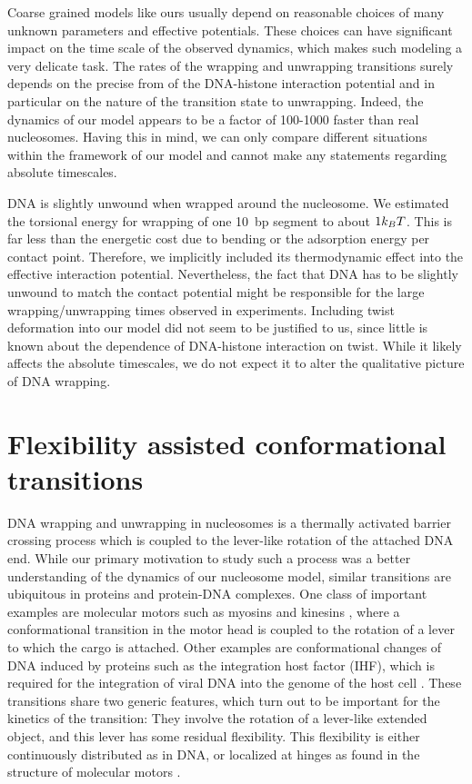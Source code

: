 Coarse grained models like ours usually depend on reasonable choices of 
many unknown parameters and effective potentials. These choices can have significant impact
on the time scale of the observed dynamics, which makes such modeling a very delicate task. 
The rates of the wrapping and unwrapping transitions surely depends on the precise from 
of the DNA-histone interaction potential and in particular on the nature of the transition
state to unwrapping. Indeed, the dynamics of our model appears to be a factor of 100-1000 
faster than real nucleosomes. Having this in mind, 
we can only compare different situations within the framework of our model and cannot make any 
statements regarding absolute timescales. 

DNA is slightly unwound when wrapped around the nucleosome. 
We estimated the torsional energy for wrapping of one 10~bp segment to about $1k_BT$. This is far
less than the energetic cost due to bending or the adsorption energy per contact point. Therefore, we
implicitly included its thermodynamic effect into the effective interaction potential.
Nevertheless, the fact that DNA has to be slightly unwound to match 
the contact potential might be responsible for the large
wrapping/unwrapping times observed in experiments. Including twist deformation into our model
did not seem to be justified to us, since little is known about the dependence of DNA-histone interaction 
on twist. While it likely affects the absolute timescales, we do not expect it to alter the 
qualitative picture of DNA wrapping.


\section{\label{sec:tsr}Flexibility assisted conformational transitions}
DNA wrapping and unwrapping in nucleosomes is a thermally activated barrier crossing process
which is coupled to the lever-like rotation of the attached DNA end. While our primary motivation to
study such a process was a better understanding of the dynamics of our nucleosome model, similar transitions
are ubiquitous in proteins and protein-DNA complexes. 
One class of important examples are molecular motors such as myosins and kinesins \cite{Howard_01}, 
where a conformational transition in the motor head is coupled to the rotation of a lever to which the 
cargo is attached. Other examples are conformational changes of DNA induced by proteins such as
the integration host factor (IHF), which is required for the integration of viral DNA into 
the genome of the host cell \cite{Sugimura_PNAS_06, Kuznetsov_PNAS_06}. 
These transitions share two generic features, which turn out to be important for the kinetics
of the transition: They involve the rotation of a lever-like extended object, and this lever has some residual 
flexibility. This flexibility is either continuously distributed as in DNA, or localized at hinges as found
in the structure of molecular motors \cite{Jeney_ChemPhysChem_04, Terrak_PNAS_05}.

